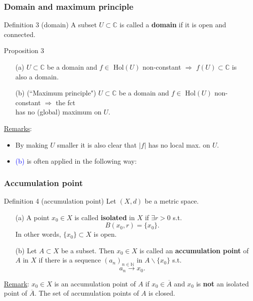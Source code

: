 \documentclass[10pt]{beamer}
\newcommand{\C}{\mathbb{C}}
\newcommand{\N}{\mathbb{N}}
\begin{document}
{\begin{frame}
\frametitle{Domain and maximum principle}
\begin{alertblock}{Definition 3 (domain)}
A subset $U\subset \C$ is called a \textbf{domain} if it is open and connected.
\end{alertblock}
\vspace{0.2cm}
\begin{block}{Proposition 3}
\begin{itemize}
\item[(a)] $U\subset \C$ be a domain and $f\in$ Hol$(U)$ non-constant $\Rightarrow$ $f(U) \subset \C$ is also a domain.
\item[(b)] (``Maximum principle") $U\subset \C$ be a domain and $f\in$ Hol$(U)$ non-constant $\Rightarrow$ the fct\\
\vspace{0.5cm}
has no (global) maximum on $U$.
\end{itemize}
\end{block}
\underline{Remarks}:
\begin{itemize}
\item By  making $U$ smaller it is also clear that $|f|$ has no local max. on $U$.
\item \textcolor{blue}{(b)} is often applied in the following way:
\\
\vspace{1cm}
\end{itemize}
\end{frame}

\begin{frame}
\frametitle{Accumulation point}
\begin{alertblock}{Definition 4 (accumulation point)}
Let $(X,d)$ be a metric space.
\begin{itemize}
\item[(a)] A point $x_0\in X$ is called \textbf{isolated} in $X$ if $\exists r>0$ s.t.
$$B(x_0,r)=\{x_0\}.$$
In other words, $\{x_0\} \subset X$ is open.
\item[(b)] Let $A \subset X$ be a subset. Then $x_0 \in X$ is called an \textbf{accumulation point} of $A$ in $X$ if there is a sequence $(a_n)_{n\in \N}$ in $A\backslash\{x_0\}$ s.t.
$$a_n \rightarrow x_0.$$
\end{itemize}
\end{alertblock}
\vspace{0.2cm}
\underline{Remark}: $x_0\in X$ is an accumulation point of $A$ if $x_0 \in \overline{A}$ and $x_0$ is \textbf{not} an isolated point of $\overline{A}$. The set of accumulation points of $A$ is closed.
\end{frame}

}
\end{document}
